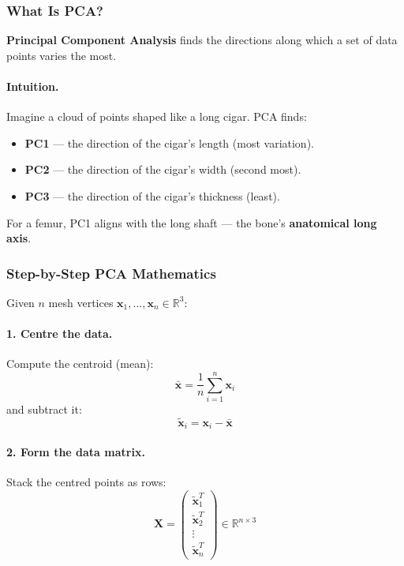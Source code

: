 \documentclass[12pt,a4paper]{article}
\begin{document}
\subsubsection{What Is PCA?}

\textbf{Principal Component Analysis} finds the directions along which a set of
data points varies the most.

\paragraph{Intuition.}
Imagine a cloud of points shaped like a long cigar.  PCA finds:
\begin{itemize}
    \item \textbf{PC1} — the direction of the cigar's length (most variation).
    \item \textbf{PC2} — the direction of the cigar's width (second most).
    \item \textbf{PC3} — the direction of the cigar's thickness (least).
\end{itemize}

For a femur, PC1 aligns with the long shaft — the bone's
\textbf{anatomical long axis}.

\subsubsection{Step-by-Step PCA Mathematics}

Given $n$ mesh vertices $\mathbf{x}_1, \ldots, \mathbf{x}_n \in \mathbb{R}^3$:

\paragraph{1. Centre the data.}
Compute the centroid (mean):
\begin{equation}
    \bar{\mathbf{x}} = \frac{1}{n} \sum_{i=1}^{n} \mathbf{x}_i
\end{equation}
and subtract it:
\begin{equation}
    \tilde{\mathbf{x}}_i = \mathbf{x}_i - \bar{\mathbf{x}}
\end{equation}

\paragraph{2. Form the data matrix.}
Stack the centred points as rows:
\begin{equation}
    \mathbf{X} =
    \begin{pmatrix}
        \tilde{\mathbf{x}}_1^T \\
        \tilde{\mathbf{x}}_2^T \\
        \vdots \\
        \tilde{\mathbf{x}}_n^T
    \end{pmatrix}
    \in \mathbb{R}^{n \times 3}
\end{equation}
\end{document}
